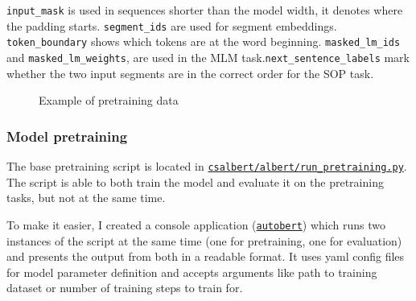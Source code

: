 \documentclass[
  printed, %
  color,   %
  table,   %
  oneside, %
  lof,     %
  lot,     %
]{fithesis3}
\begin{document}
\texttt{input\_mask} is used in sequences shorter than the model width, it denotes where the padding starts. \texttt{segment\_ids} are used for segment embeddings. \texttt{token\_boundary} shows which tokens are at the word beginning. \texttt{masked\_lm\_ids} and \texttt{masked\_lm\_weights}, are used in the MLM task.\texttt{next\_sentence\_labels} mark whether the two input segments are in the correct order for the SOP task.


\begin{figure}[h]
    \caption{Example of pretraining data}
    \label{fig:pretraining-data}
    \centering
\end{figure}



\subsubsection{Model pretraining}

The base pretraining script is located in
\href{https://github.com/ZepZep/csalbert/blob/master/albert/run_pretraining.py} {\texttt{csalbert/albert/run\_\linebreak{}pretraining.py}}. The script is able to both train the model and evaluate it on the pretraining tasks, but not at the same time.

To make it easier, I created a console application (\href{https://github.com/ZepZep/csalbert/blob/master/pretraining/autobert.py}{\texttt{autobert}}) which runs two instances of the script at the same time (one for pretraining, one for evaluation) and presents the output from both in a readable format. It uses yaml config files for model parameter definition and accepts arguments like path to training dataset or number of training steps to train for.
\end{document}
